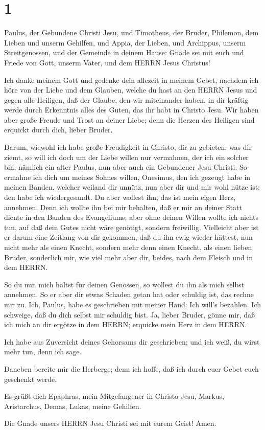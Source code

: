 \hypertarget{section}{%
\section{1}\label{section}}

 Paulus, der Gebundene Christi Jesu, und Timotheus, der
Bruder, Philemon, dem Lieben und unserm Gehilfen,  und
Appia, der Lieben, und Archippus, unserm Streitgenossen, und der
Gemeinde in deinem Hause:  Gnade sei mit euch und Friede von
Gott, unserm Vater, und dem HERRN Jesus Christus!

 Ich danke meinem Gott und gedenke dein allezeit in meinem
Gebet,  nachdem ich höre von der Liebe und dem Glauben,
welche du hast an den HERRN Jesus und gegen alle Heiligen, 
daß der Glaube, den wir miteinander haben, in dir kräftig werde durch
Erkenntnis alles des Guten, das ihr habt in Christo Jesu. 
Wir haben aber große Freude und Trost an deiner Liebe; denn die Herzen
der Heiligen sind erquickt durch dich, lieber Bruder.

 Darum, wiewohl ich habe große Freudigkeit in Christo, dir
zu gebieten, was dir ziemt,  so will ich doch um der Liebe
willen nur vermahnen, der ich ein solcher bin, nämlich ein alter Paulus,
nun aber auch ein Gebundener Jesu Christi.  So ermahne ich
dich um meines Sohnes willen, Onesimus, den ich gezeugt habe in meinen
Banden,  welcher weiland dir unnütz, nun aber dir und mir
wohl nütze ist; den habe ich wiedergesandt.  Du aber
wollest ihn, das ist mein eigen Herz, annehmen.  Denn ich
wollte ihn bei mir behalten, daß er mir an deiner Statt diente in den
Banden des Evangeliums;  aber ohne deinen Willen wollte ich
nichts tun, auf daß dein Gutes nicht wäre genötigt, sondern freiwillig.
 Vielleicht aber ist er darum eine Zeitlang von dir
gekommen, daß du ihn ewig wieder hättest,  nun nicht mehr
als einen Knecht, sondern mehr denn einen Knecht, als einen lieben
Bruder, sonderlich mir, wie viel mehr aber dir, beides, nach dem Fleisch
und in dem HERRN.

 So du nun mich hältst für deinen Genossen, so wollest du
ihn als mich selbst annehmen.  So er aber dir etwas Schaden
getan hat oder schuldig ist, das rechne mir zu.  Ich,
Paulus, habe es geschrieben mit meiner Hand: Ich will's bezahlen. Ich
schweige, daß du dich selbst mir schuldig bist.  Ja, lieber
Bruder, gönne mir, daß ich mich an dir ergötze in dem HERRN; erquicke
mein Herz in dem HERRN.

 Ich habe aus Zuversicht deines Gehorsams dir geschrieben;
und ich weiß, du wirst mehr tun, denn ich sage.

 Daneben bereite mir die Herberge; denn ich hoffe, daß ich
durch euer Gebet euch geschenkt werde.

 Es grüßt dich Epaphras, mein Mitgefangener in Christo
Jesu,  Markus, Aristarchus, Demas, Lukas, meine Gehilfen.

 Die Gnade unsers HERRN Jesu Christi sei mit eurem Geist!
Amen.
